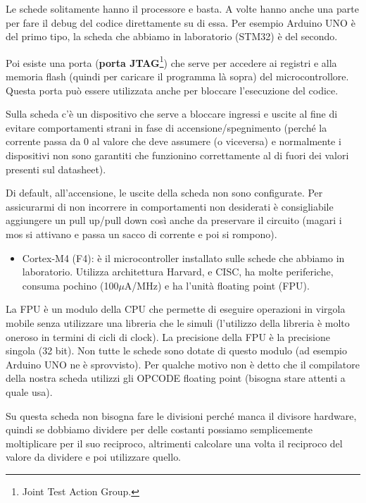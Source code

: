 \documentclass[
]{book}
\providecommand{\tightlist}{%
  \setlength{\itemsep}{0pt}\setlength{\parskip}{0pt}}
\begin{document}
Le schede solitamente hanno il processore e basta. A volte hanno anche
una parte per fare il debug del codice direttamente su di essa. Per
esempio Arduino UNO è del primo tipo, la scheda che abbiamo in
laboratorio (STM32) è del secondo.

Poi esiste una porta (\textbf{porta JTAG}\footnote{Joint Test Action
  Group.}) che serve per accedere ai registri e alla memoria flash
(quindi per caricare il programma là sopra) del microcontrollore. Questa
porta può essere utilizzata anche per bloccare l'esecuzione del codice.

Sulla scheda c'è un dispositivo che serve a bloccare ingressi e uscite
al fine di evitare comportamenti strani in fase di
accensione/spegnimento (perché la corrente passa da 0 al valore che deve
assumere (o viceversa) e normalmente i dispositivi non sono garantiti
che funzionino correttamente al di fuori dei valori presenti sul
datasheet).

Di default, all'accensione, le uscite della scheda non sono configurate.
Per assicurarmi di non incorrere in comportamenti non desiderati è
consigliabile aggiungere un pull up/pull down così anche da preservare
il circuito (magari i mos si attivano e passa un sacco di corrente e poi
si rompono).

\begin{itemize}
\tightlist
\item
  Cortex-M4 (F4): è il microcontroller installato sulle schede che
  abbiamo in laboratorio. Utilizza architettura Harvard, e CISC, ha
  molte periferiche, consuma pochino (100\(\mu\)A/MHz) e ha l'unità
  floating point (FPU).
\end{itemize}

La FPU è un modulo della CPU che permette di eseguire operazioni in
virgola mobile senza utilizzare una libreria che le simuli (l'utilizzo
della libreria è molto oneroso in termini di cicli di clock). La
precisione della FPU è la precisione singola (32 bit). Non tutte le
schede sono dotate di questo modulo (ad esempio Arduino UNO ne è
sprovvisto). Per qualche motivo non è detto che il compilatore della
nostra scheda utilizzi gli OPCODE floating point (bisogna stare attenti
a quale usa).

Su questa scheda non bisogna fare le divisioni perché manca il divisore
hardware, quindi se dobbiamo dividere per delle costanti possiamo
semplicemente moltiplicare per il suo reciproco, altrimenti calcolare
una volta il reciproco del valore da dividere e poi utilizzare quello.
\end{document}
